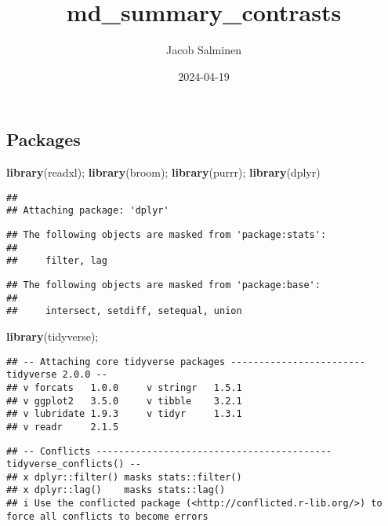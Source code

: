 \documentclass[
]{article}
\title{md\_summary\_contrasts}
\author{Jacob Salminen}
\date{2024-04-19}
\newenvironment{Shaded}{\begin{snugshade}}{\end{snugshade}}
\newcommand{\FunctionTok}[1]{\textcolor[rgb]{0.13,0.29,0.53}{\textbf{#1}}}
\newcommand{\NormalTok}[1]{#1}
\begin{document}
\maketitle

\hypertarget{packages}{%
\subsection{Packages}\label{packages}}

\begin{Shaded}
\begin{Highlighting}[]
\FunctionTok{library}\NormalTok{(readxl);}
\FunctionTok{library}\NormalTok{(broom);}
\FunctionTok{library}\NormalTok{(purrr);}
\FunctionTok{library}\NormalTok{(dplyr)}
\end{Highlighting}
\end{Shaded}

\begin{verbatim}
## 
## Attaching package: 'dplyr'
\end{verbatim}

\begin{verbatim}
## The following objects are masked from 'package:stats':
## 
##     filter, lag
\end{verbatim}

\begin{verbatim}
## The following objects are masked from 'package:base':
## 
##     intersect, setdiff, setequal, union
\end{verbatim}

\begin{Shaded}
\begin{Highlighting}[]
\FunctionTok{library}\NormalTok{(tidyverse);}
\end{Highlighting}
\end{Shaded}

\begin{verbatim}
## -- Attaching core tidyverse packages ------------------------ tidyverse 2.0.0 --
## v forcats   1.0.0     v stringr   1.5.1
## v ggplot2   3.5.0     v tibble    3.2.1
## v lubridate 1.9.3     v tidyr     1.3.1
## v readr     2.1.5
\end{verbatim}

\begin{verbatim}
## -- Conflicts ------------------------------------------ tidyverse_conflicts() --
## x dplyr::filter() masks stats::filter()
## x dplyr::lag()    masks stats::lag()
## i Use the conflicted package (<http://conflicted.r-lib.org/>) to force all conflicts to become errors
\end{verbatim}
\end{document}
